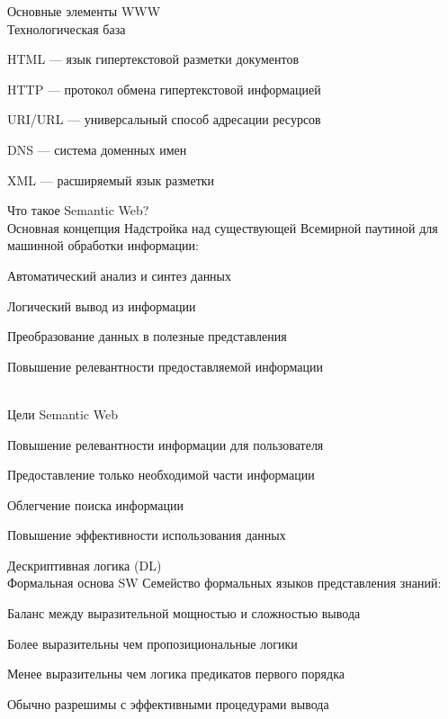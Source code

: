 \begin{frame}{Основные элементы WWW\\Технологическая база}
	\topline
	\justifying
	\begin{textitemize}
		\item HTML --- язык гипертекстовой разметки документов
		\item HTTP --- протокол обмена гипертекстовой информацией
		\item URI/URL --- универсальный способ адресации ресурсов
		\item DNS --- система доменных имен
		\item XML --- расширяемый язык разметки
	\end{textitemize}
\end{frame}

\begin{frame}{Что такое Semantic Web?\\Основная концепция}
	\topline
	\justifying
	Надстройка над существующей Всемирной паутиной для машинной обработки информации:
	\begin{textitemize}
		\item Автоматический анализ и синтез данных
		\item Логический вывод из информации
		\item Преобразование данных в полезные представления
		\item Повышение релевантности предоставляемой информации
	\end{textitemize}
\end{frame}

\begin{frame}{\\Цели Semantic Web}
	\topline
	\justifying
	\begin{textitemize}
		\item Повышение релевантности информации для пользователя
		\item Предоставление только необходимой части информации
		\item Облегчение поиска информации
		\item Повышение эффективности использования данных
	\end{textitemize}
\end{frame}

\begin{frame}{Дескриптивная логика (DL)\\Формальная основа SW}
	\topline
	\justifying
	Семейство формальных языков представления знаний:
	\begin{textitemize}
		\item Баланс между выразительной мощностью и сложностью вывода
		\item Более выразительны чем пропозициональные логики
		\item Менее выразительны чем логика предикатов первого порядка
		\item Обычно разрешимы с эффективными процедурами вывода
	\end{textitemize}
\end{frame}

